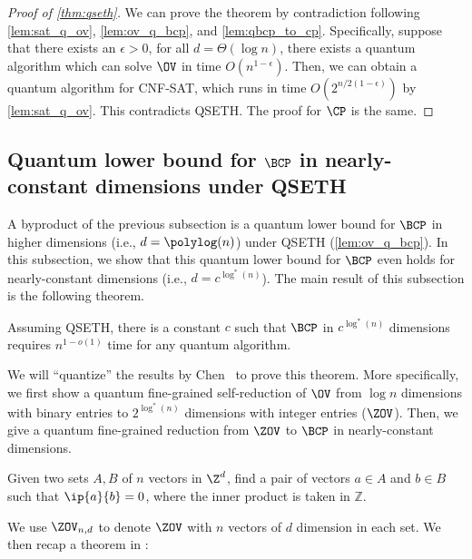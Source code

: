 \begin{proof}[Proof of \cref{thm:qseth}]

We can prove the theorem by contradiction following \cref{lem:sat_q_ov}, \cref{lem:ov_q_bcp}, and \cref{lem:qbcp_to_cp}. Specifically, suppose that there exists an $\epsilon>0$, for all $d=\Theta(\log n)$, there exists a quantum algorithm which can solve $\OV$ in time $O(n^{1-\epsilon})$. Then, we can obtain a quantum algorithm for \textsf{CNF-SAT}, which runs in time $O(2^{n/2(1-\epsilon)})$ by \cref{lem:sat_q_ov}. This contradicts QSETH. The proof for $\CP$ is the same. 
\end{proof}

\subsection{Quantum lower bound for $\BCP$ in nearly-constant dimensions under QSETH}
A byproduct of the previous subsection is a quantum lower bound for $\BCP$ in higher dimensions (i.e., $d = \polylog(n)$) under QSETH (\cref{lem:ov_q_bcp}). In this subsection, we show that this quantum lower bound for $\BCP$ even holds for nearly-constant dimensions (i.e., $d = c^{\log^*(n)}$). The main result of this subsection is the following theorem.
\begin{theorem}\label{thm:qseth_2_bcp}
Assuming QSETH, there is a constant $c$ such that $\BCP$ in $c^{\log^* (n)}$ dimensions requires $n^{1-o(1)}$ time for any quantum algorithm.
\end{theorem}

We will ``quantize'' the results by Chen~\cite{r17} to prove this theorem. More specifically, we first show a quantum fine-grained self-reduction of $\OV$ from $\log n$ dimensions with binary entries to $2^{\log ^* (n)}$ dimensions with integer entries ($\ZOV$). Then, we give a quantum fine-grained reduction from $\ZOV$ to $\BCP$ in nearly-constant dimensions.

\begin{definition}
Given two sets $A,B$ of $n$ vectors in $\mathbb \Z^d$, find a pair of vectors $a\in A$ and $b\in B$ such that
$\ip{a}{b}=0$, where the inner product is taken in $\mathbb{Z}$.
\end{definition}

We use $\ZOV_{n,d}$ to denote $\ZOV$  with $n$ vectors of $d$ dimension in each set. We then recap a theorem in \cite{r17}:


